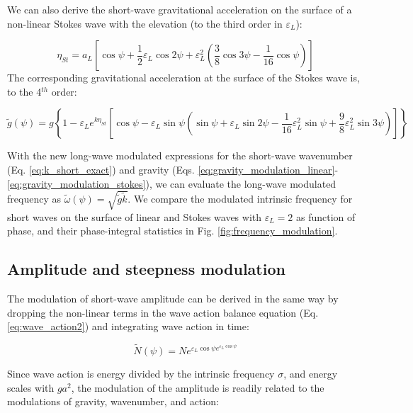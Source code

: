 \documentclass[draft]{agujournal2019}
\begin{document}
We can also derive the short-wave gravitational acceleration on the surface of
a non-linear Stokes wave with the elevation (to the third order in $\varepsilon_L$):

\begin{equation}
\label{eq:eta_stokes}
\eta_{St} = a_L \left[
  \cos{\psi} +
  \dfrac{1}{2} \varepsilon_L \cos{2\psi} +
  \varepsilon_L^2 \left( \dfrac{3}{8} \cos{3\psi} - \dfrac{1}{16} \cos{\psi} \right)
\right]
\end{equation}
The corresponding gravitational acceleration at the surface of the Stokes wave
is, to the 4$^{th}$ order:

\begin{equation}
\label{eq:gravity_modulation_stokes}
\widetilde{g}(\psi) =
g \left\{
  1 - \varepsilon_L e^{k \eta_{St}}
  \left[ \cos{\psi} -
    \varepsilon_L \sin{\psi} \left(
      \sin{\psi}
      + \varepsilon_L \sin{2\psi}
      - \dfrac{1}{16} \varepsilon_L^2 \sin{\psi}
      + \dfrac{9}{8} \varepsilon_L^2 \sin{3\psi}
    \right)
  \right]
\right\}
\end{equation}

With the new long-wave modulated expressions for the short-wave wavenumber
(Eq. \ref{eq:k_short_exact}) and gravity
(Eqs. \ref{eq:gravity_modulation_linear}-\ref{eq:gravity_modulation_stokes}),
we can evaluate the long-wave modulated frequency as
$\widetilde{\omega}(\psi) = \sqrt{\widetilde{g} \widetilde{k}}$.
We compare the modulated intrinsic frequency for short waves on the surface of
linear and Stokes waves with $\varepsilon_L=2$ as function of phase, and their
phase-integral statistics in Fig. \ref{fig:frequency_modulation}.

\subsection{Amplitude and steepness modulation}
\label{subsection:amplitude_modulation}

The modulation of short-wave amplitude can be derived in the same way by
dropping the non-linear terms in the wave action balance equation
(Eq. \ref{eq:wave_action2}) and integrating wave action in time:

\begin{equation}
\label{eq:wave_action_modulation}
\widetilde{N}(\psi) = N e^{\varepsilon_L \cos{\psi} e^{\varepsilon_L \cos{\psi}}}
\end{equation}

Since wave action is energy divided by the intrinsic frequency $\sigma$,
and energy scales with $ga^2$, the modulation of the amplitude is readily
related to the modulations of gravity, wavenumber, and action:
\end{document}
